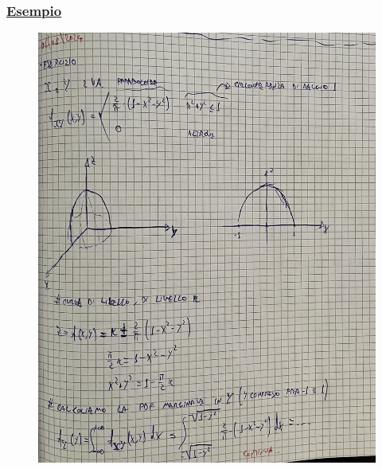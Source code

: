 \documentclass{article}
\begin{document}
\subsubsection{\underline{Esempio}}
\begin{figure}[H]
\centering
\includegraphics[scale=0.14]{ese/44.jpeg}
\end{figure} 
\end{document}
